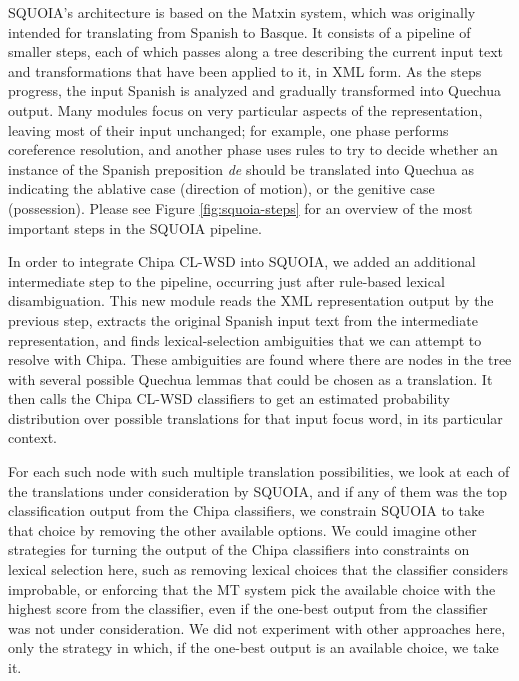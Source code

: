 SQUOIA's architecture is based on the Matxin system\cite{matxin2005}, which
was originally intended for translating from Spanish to Basque. It consists of
a pipeline of smaller steps, each of which passes along a tree describing the
current input text and transformations that have been applied to it, in XML
form. As the steps progress, the input Spanish is analyzed and gradually
transformed into Quechua output. Many modules focus on very particular aspects
of the representation, leaving most of their input unchanged; for example, one
phase performs coreference resolution, and another phase uses rules to try to
decide whether an instance of the Spanish preposition \emph{de} should be
translated into Quechua as indicating the ablative case (direction of motion),
or the genitive case (possession). Please see Figure \ref{fig:squoia-steps} for
an overview of the most important steps in the SQUOIA pipeline.

In order to integrate Chipa CL-WSD into SQUOIA, we added an additional
intermediate step to the pipeline, occurring just after rule-based lexical
disambiguation. This new module reads the XML representation output by the
previous step, extracts the original Spanish input text from the intermediate
representation, and finds lexical-selection ambiguities that we can attempt to
resolve with Chipa. These ambiguities are found where there are nodes in the
tree with several possible Quechua lemmas that could be chosen as a
translation. It then calls the Chipa CL-WSD classifiers to get an estimated
probability distribution over possible translations for that input focus word,
in its particular context.

For each such node with such multiple translation possibilities, we look at
each of the translations under consideration by SQUOIA, and if any of them was
the top classification output from the Chipa classifiers, we constrain SQUOIA
to take that choice by removing the other available options. We could imagine
other strategies for turning the output of the Chipa classifiers into
constraints on lexical selection here, such as removing lexical choices that
the classifier considers improbable, or enforcing that the MT system pick the
available choice with the highest score from the classifier, even if the
one-best output from the classifier was not under consideration. We did not
experiment with other approaches here, only the strategy in which, if the
one-best output is an available choice, we take it.

